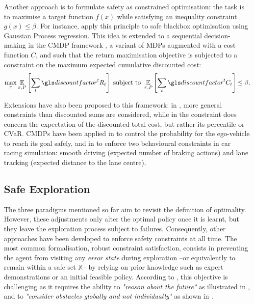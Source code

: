 Another approach is to formulate safety as constrained optimisation: the task is to maximise a target function $f(x)$ while satisfying an inequality constraint $g(x)\leq \beta$. For instance, \citet{Berkenkamp2016} apply this principle to safe blackbox optimisation using Gaussian Process regression. This idea is extended to a sequential decision-making in the \gls{CMDP} framework \citep{Altman1999,Achiam2017}, a variant of \glspl{MDP} augmented with a cost function $C$, and such that the return maximisation objective is subjected to a constraint on the maximum expected cumulative discounted cost:
\begin{equation*}
\max_\pi \expectedvalue_{\pi, P} \left[\sum_t \discount^t R_t \right] \text{ subject to } \expectedvalue_{\pi, P} \left[\sum_t \discount^t C_t \right] \leq \beta.
\end{equation*}

Extensions have also been proposed to this framework: in \citep{Tessler2019}, more general constraints than discounted sums are considered, while in \citep{Geibel2005,Chow2018} the constraint does concern the expectation of the discounted total cost, but rather its percentile or \gls{CVaR}. 
\glspl{CMDP} have been applied in \citep{Bouton2019workshop,Bouton2019} to control the probability for the ego-vehicle to reach its goal safely, and in \citep{Le2019} to enforce two behavioural constraints in car racing simulation: smooth driving (expected number of braking actions) and lane tracking (expected distance to the lane centre).

\subsection{Safe Exploration}

The three paradigms mentioned so far aim to revisit the definition of optimality. However, these adjustments only alter the optimal policy once it is learnt, but they leave the exploration process subject to failures. Consequently, other approaches have been developed to enforce safety constraints at all time. The most common formalisation, robust constraint satisfaction, consists in preventing the agent from visiting any \emph{error state} during exploration --or equivalently to remain within a safe set $\mathbb{X}$-- by relying on prior knowledge such as expert demonstrations or an initial feasible policy.
According to \citet{Fraichard2014}, this objective is challenging as it requires the ability to \textit{"reason about the future"} as illustrated in , and to \textit{"consider obstacles globally and not individually"} as shown in .

